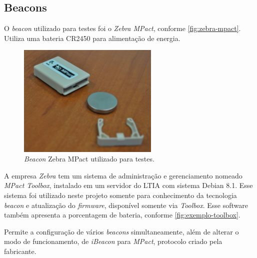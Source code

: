 \documentclass[
		12pt,				%
		openright,			%
		oneside,			%
		a4paper,			%
		chapter=TITLE,		%
		english,			%
		brazil				%
	]{abntex2}
\begin{document}
\subsection{Beacons}\label{sec:beacons-modo}

O \textit{beacon} utilizado para testes foi o \textit{Zebra MPact}, conforme \autoref{fig:zebra-mpact}. Utiliza uma bateria CR2450 para alimentação de energia. 

\begin{figure}[htb]
	\caption{\label{fig:zebra-mpact}\textit{Beacon} Zebra MPact utilizado para testes.}
	\begin{center}
		\includegraphics[width=0.6\textwidth]{img/beacon-mpact2.jpg}
	\end{center}
\end{figure}

A empresa \textit{Zebra} tem um sistema de administração e gerenciamento nomeado \textit{MPact Toolbox}, instalado em um servidor do LTIA com sistema Debian 8.1. Esse sistema foi utilizado neste projeto somente para conhecimento da tecnologia \textit{beacon} e atualização do \textit{firmware}, disponível somente via \textit{Toolbox}. Esse software também apresenta a porcentagem de bateria, conforme \autoref{fig:exemplo-toolbox}. 

Permite a configuração de vários \textit{beacons} simultaneamente, além de alterar o modo de funcionamento, de \textit{iBeacon} para \textit{MPact}, protocolo criado pela fabricante.
\end{document}
